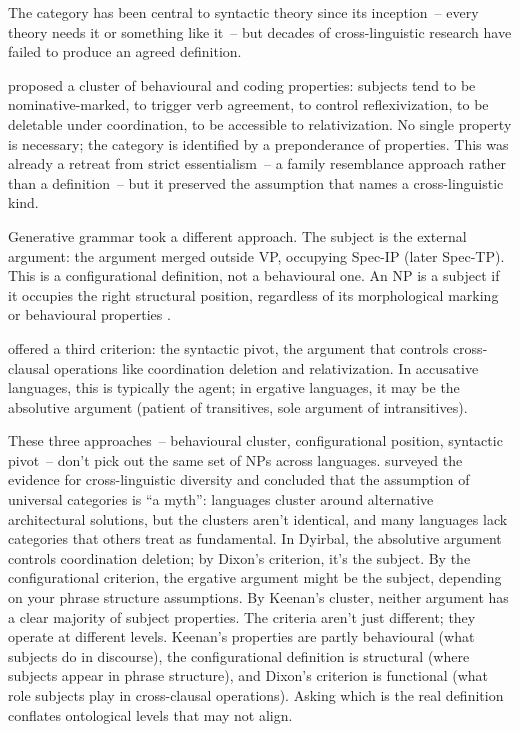 The category  has been central to syntactic theory since its inception~-- every theory needs it or something like it~-- but decades of cross-linguistic research have failed to produce an agreed definition.

\textcite{keenan1976towards} proposed a cluster of behavioural and coding properties: subjects tend to be nominative-marked, to trigger verb agreement, to control reflexivization, to be deletable under coordination, to be accessible to relativization. No single property is necessary; the category is identified by a preponderance of properties. This was already a retreat from strict essentialism~-- a family resemblance approach rather than a definition~-- but it preserved the assumption that  names a cross-linguistic kind.

Generative grammar took a different approach. The subject is the external argument: the argument merged outside VP, occupying Spec-IP (later Spec-TP). This is a configurational definition, not a behavioural one. An NP is a subject if it occupies the right structural position, regardless of its morphological marking or behavioural properties \autocite{chomsky1981}.

\textcite{dixon1994ergativity} offered a third criterion: the syntactic pivot, the argument that controls cross-clausal operations like coordination deletion and relativization. In accusative languages, this is typically the agent; in ergative languages, it may be the absolutive argument (patient of transitives, sole argument of intransitives).

These three approaches~-- behavioural cluster, configurational position, syntactic pivot~-- don't pick out the same set of NPs across languages. \textcite{evanslevinson2009} surveyed the evidence for cross-linguistic diversity and concluded that the assumption of universal categories is \enquote{a myth}: languages cluster around alternative architectural solutions, but the clusters aren't identical, and many languages lack categories that others treat as fundamental. In Dyirbal, the absolutive argument controls coordination deletion; by Dixon's criterion, it's the subject. By the configurational criterion, the ergative argument might be the subject, depending on your phrase structure assumptions. By Keenan's cluster, neither argument has a clear majority of subject properties. The criteria aren't just different; they operate at different levels. Keenan's properties are partly behavioural (what subjects do in discourse), the configurational definition is structural (where subjects appear in phrase structure), and Dixon's criterion is functional (what role subjects play in cross-clausal operations). Asking which is the real definition conflates ontological levels that may not align.

